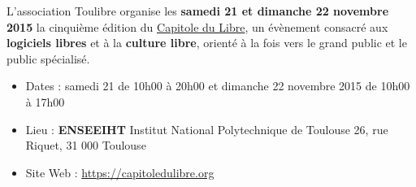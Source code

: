 

\begin{doublespace}
\begin{large}
  L'association Toulibre organise les \textbf{samedi 21 et dimanche 22 novembre 2015} la cinquième
  édition du \href{http://capitoledulibre.org}{Capitole du Libre},
  un évènement consacré aux \textbf{logiciels libres} et à la \textbf{culture libre},
  orienté à la fois vers le grand public et le public spécialisé.
\end{large}
\end{doublespace}
\begin{itemize}[label=$\bullet$]
\item Dates : samedi 21 de 10h00 à 20h00 et dimanche 22 novembre 2015 de 10h00 à 17h00
\item Lieu : \textbf{ENSEEIHT} Institut National Polytechnique de Toulouse
26, rue Riquet, 31 000 Toulouse
\item Site Web : \url{https://capitoledulibre.org}
\end{itemize}
